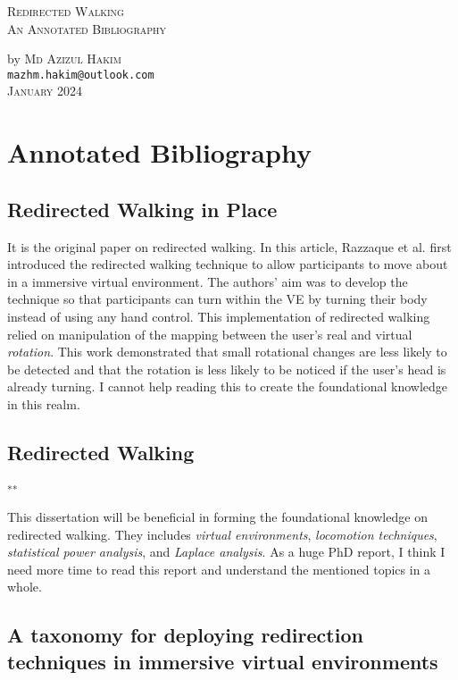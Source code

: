 \documentclass[12pt]{article}
\makeatletter
\newcommand\topPageBottom{
\noindent \hrulefill by {\scshape Md Azizul Hakim}\noindent \hrulefill \\
\normalsize
\texttt{mazhm.hakim@outlook.com} \\
\vspace{2.0em}
{\scshape January 2024}
}
\makeatother
\begin{document}
\begin{center}
\Huge
{\scshape Redirected Walking} \\
\LARGE
{\scshape An Annotated Bibliography} \\
\large
\topPageBottom
\end{center}

\vspace{2.0em}

\section{Annotated Bibliography}

\subsection{Redirected Walking in Place}

\textbf{\cite{razzaque2002redirected}}

It is the original paper on redirected walking. In this article, Razzaque et al. first introduced the redirected walking technique to allow participants to move about in a immersive virtual environment. The authors' aim was to develop the technique so that participants can turn within the VE by turning their body instead of using any hand control. This implementation of redirected walking relied on manipulation of the mapping between the user's real and virtual \emph{rotation}. This work demonstrated that small rotational changes are less likely to be detected and that the rotation is less likely to be noticed if the user's head is already turning. I cannot help reading this to create the foundational knowledge in this realm.


\subsection{Redirected Walking}
\textbf{\cite{razzaque2005redirected}}\textsuperscript{**}

This dissertation will be beneficial in forming the foundational knowledge on redirected walking. They includes \emph{virtual environments}, \emph{locomotion techniques}, \emph{statistical power analysis}, and \emph{Laplace analysis}. As a huge PhD report, I think I need more time to read this report and understand the mentioned topics in a whole.

\subsection{A taxonomy for deploying redirection techniques in immersive virtual environments}
\textbf{\cite{suma2012taxonomy}}
\end{document}
